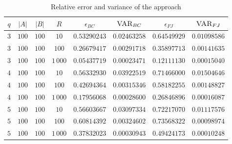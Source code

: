 \begin{table}[h]
	\centering
	\begin{tabular}{|c|c|c|c|c|c|c|c|}
		\hline
		$q$ & $|A|$ & $|B|$ & $R$      & $\epsilon_{BC}$ & $\textsc{VAR}_{BC}$ & $\epsilon_{FJ}$ & $\textsc{VAR}_{FJ}$ \\ \hline \hline
		$3$ & $100$ & $100$ & $10$     & $0.53290243$    & $0.02463258$        & $0.64549929$    & $0.01098586$        \\ \hline
		$3$ & $100$ & $100$ & $100$    & $0.26679417$    & $0.00291718$        & $0.35897713$    & $0.00141635$        \\ \hline
		$3$ & $100$ & $100$ & $1\,000$ & $0.05437719$    & $0.00023471$        & $0.12111130$    & $0.00015040$        \\ \hline \hline
		$4$ & $100$ & $100$ & $10$     & $0.56332930$    & $0.03922519$        & $0.71466000$    & $0.01504646$        \\ \hline
		$4$ & $100$ & $100$ & $100$    & $0.42694364$    & $0.00315346$        & $0.58182255$    & $0.00148827$        \\ \hline
		$4$ & $100$ & $100$ & $1\,000$ & $0.17956068$    & $0.00028600$        & $0.26846896$    & $0.00016087$        \\ \hline \hline
		$5$ & $100$ & $100$ & $10$     & $0.56603667$    & $0.03097334$        & $0.72217070$    & $0.01117576$        \\ \hline
		$5$ & $100$ & $100$ & $100$    & $0.60814392$    & $0.00324602$        & $0.73568322$    & $0.00098974$        \\ \hline
		$5$ & $100$ & $100$ & $1\,000$ & $0.37832023$    & $0.00030943$        & $0.49424173$    & $0.00010248$        \\ \hline
	\end{tabular}
	\caption{Relative error and variance of the \fsamp approach}	
\end{table}

